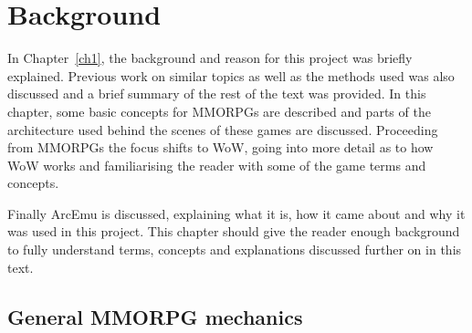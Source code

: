 \chapter{Background} %
\label{ch2}

In Chapter~\ref{ch1}, the background and reason for this project was briefly explained. Previous work on similar topics as well as the methods used was also discussed and a brief summary of the rest of the text was provided. In this chapter, some basic concepts for MMORPGs are described and parts of the architecture used behind the scenes of these games are discussed. Proceeding from MMORPGs the focus shifts to WoW, going into more detail as to how WoW works and familiarising the reader with some of the game terms and concepts.

Finally ArcEmu is discussed, explaining what it is, how it came about and why it was used in this project. This chapter should give the reader enough background to fully understand terms, concepts and explanations discussed further on in this text.

\section{General MMORPG mechanics} 
\label{mechanics}


